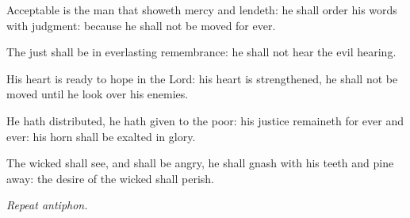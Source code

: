 \documentclass[letterpaper,12pt]{article} %
\begin{document}
\begin{parcolumns}[rulebetween]{2}
{\begin{psalmverses}[0]
\item Acceptable is the man that showeth mercy and lendeth: he shall order his words with judgment: because he shall not be moved for ever.
\item The just shall be in everlasting remembrance: he shall not hear the evil hearing.
\item His heart is ready to hope in the Lord: his heart is strengthened, he shall not be moved until he look over his enemies.
\item He hath distributed, he hath given to the poor: his justice remaineth for ever and ever: his horn shall be exalted in glory.
\item The wicked shall see, and shall be angry, he shall gnash with his teeth and pine away: the desire of the wicked shall perish.
\end{psalmverses}
}
\end{parcolumns}

\smallskip
{\noindent\emph{Repeat antiphon.}\\}

\pagebreak
\end{document}
